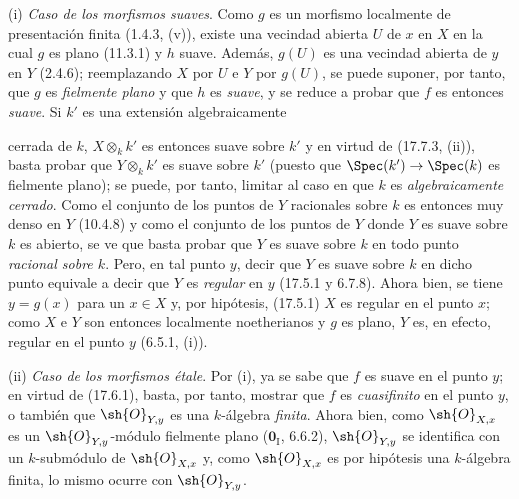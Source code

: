 (i) \emph{Caso de los morfismos suaves}. Como $g$ es un morfismo localmente de presentación finita (1.4.3, (v)), existe una vecindad abierta $U$ de $x$ en $X$ en la cual $g$ es plano (11.3.1) y $h$ suave. Además, $g(U)$ es una vecindad abierta de $y$ en $Y$ (2.4.6); reemplazando $X$ por $U$ e $Y$ por $g(U)$, se puede suponer, por tanto, que $g$ es \emph{fielmente plano} y que $h$ es \emph{suave}, y se reduce a probar que $f$ es entonces \emph{suave}. Si $k'$ es una extensión algebraicamente


cerrada de $k$, $X\otimes_k k'$ es entonces suave sobre $k'$ y en virtud de (17.7.3, (ii)), basta probar que $Y\otimes_k k'$ es suave sobre $k'$ (puesto que $\Spec(k')\to\Spec(k)$ es fielmente plano); se puede, por tanto, limitar al caso en que $k$ es \emph{algebraicamente cerrado}. Como el conjunto de los puntos de $Y$ racionales sobre $k$ es entonces muy denso en $Y$ (10.4.8) y como el conjunto de los puntos de $Y$ donde $Y$ es suave sobre $k$ es abierto, se ve que basta probar que $Y$ es suave sobre $k$ en todo punto \emph{racional sobre $k$}. Pero, en tal punto $y$, decir que $Y$ es suave sobre $k$ en dicho punto equivale a decir que $Y$ es \emph{regular} en $y$ (17.5.1 y 6.7.8). Ahora bien, se tiene $y=g(x)$ para un $x\in X$ y, por hipótesis, (17.5.1) $X$ es regular en el punto $x$; como $X$ e $Y$ son entonces localmente noetherianos y $g$ es plano, $Y$ es, en efecto, regular en el punto $y$ (6.5.1, (i)).

(ii) \emph{Caso de los morfismos étale}. Por (i), ya se sabe que $f$ es suave en el punto $y$; en virtud de (17.6.1), basta, por tanto, mostrar que $f$ es \emph{cuasifinito} en el punto $y$, o también que $\sh{O}_{Y,y}$ es una $k$-álgebra \emph{finita}. Ahora bien, como $\sh{O}_{X,x}$ es un $\sh{O}_{Y,y}$-módulo fielmente plano ($\mathbf{0}_{\mathrm I}$, 6.6.2), $\sh{O}_{Y,y}$ se identifica con un $k$-submódulo de $\sh{O}_{X,x}$ y, como $\sh{O}_{X,x}$ es por hipótesis una $k$-álgebra finita, lo mismo ocurre con $\sh{O}_{Y,y}$.

